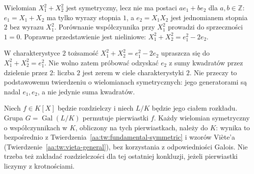 \begin{przyklad}\label{aa:prz:symmetric-nonlinear}
Wielomian $X_1^2+X_2^2$ jest symetryczny, lecz nie ma
postaci $a e_1+b e_2$ dla $a,b\in\mathbb Z$:
$e_1=X_1+X_2$ ma tylko wyrazy stopnia $1$, a
$e_2=X_1X_2$ jest jednomianem stopnia $2$ bez
wyrazu $X_1^2$. Porównanie współczynnika przy
$X_1^2$ prowadzi do sprzeczności $1=0$.
Poprawne przedstawienie jest nieliniowe:
$X_1^2+X_2^2=e_1^2-2e_2$.
\end{przyklad}

\begin{uwaga}
W charakterystyce $2$ tożsamość
$X_1^2+X_2^2=e_1^2-2e_2$ upraszcza się do
$X_1^2+X_2^2=e_1^2$.
Nie wolno zatem próbować odzyskać $e_2$ z sumy
kwadratów przez dzielenie przez $2$: liczba $2$
jest zerem w ciele charakterystyki $2$.
Nie przeczy to podstawowemu twierdzeniu o wielomianach
symetrycznych: jego generatorami są nadal $e_1,e_2$,
a nie jedynie suma kwadratów.
\end{uwaga}

\begin{uwaga}\label{aa:uw:symmetric-galois}
Niech $f\in K[X]$ będzie rozdzielczy i niech $L/K$
będzie jego ciałem rozkładu. Grupa
$G=\operatorname{Gal}(L/K)$ permutuje pierwiastki $f$.
Każdy wielomian symetryczny o współczynnikach w $K$,
obliczony na tych pierwiastkach, należy do $K$:
wynika to bezpośrednio z Twierdzenia~\ref{aa:tw:fundamental-symmetric}
i wzorów Viète'a (Twierdzenie~\ref{aa:tw:vieta-general}),
bez korzystania z odpowiedniości Galois.
Nie trzeba też zakładać rozdzielczości dla tej ostatniej
konkluzji, jeżeli pierwiastki liczymy z krotnościami.
\end{uwaga}

